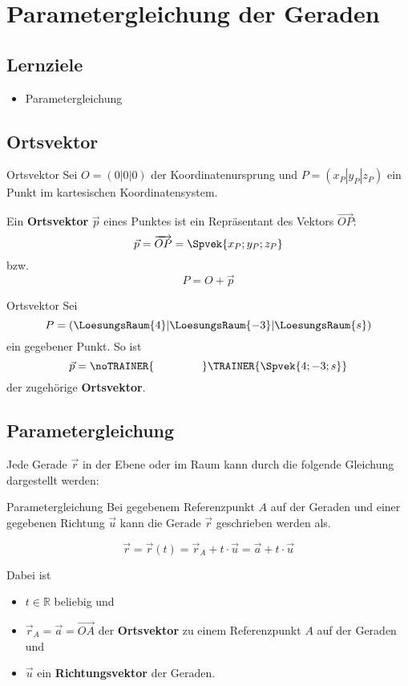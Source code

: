 \section{Parametergleichung der Geraden}

\subsection*{Lernziele}
\begin{itemize}
\item Parametergleichung
\end{itemize}

\newpage
\subsection{Ortsvektor}

\begin{definition}{Ortsvektor}{}
  Sei $O=(0|0|0)$ der Koordinatenursprung und $P=(x_P|y_P|z_P)$ ein Punkt im
  kartesischen Koordinatensystem.
  
  Ein \textbf{Ortsvektor} $\vec{p}$ eines Punktes
  ist ein Repräsentant des Vektors $\overrightarrow{OP}$:
  $$\vec{p} = \overrightarrow{OP}=\Spvek{x_P;y_P;z_P}$$
  bzw.
  $$P = O + \vec{p}$$
\end{definition}

\begin{beispiel}{Ortsvektor}{}
  Sei
  $$P=(\LoesungsRaum{4}|\LoesungsRaum{-3}|\LoesungsRaum{s})$$
  ein
gegebener Punkt. So ist
 $$\vec{p}
= \noTRAINER{\hspace{15mm}} \TRAINER{\Spvek{4;-3;s}}$$
der zugehörige \textbf{Ortsvektor}.
\end{beispiel}

\newpage
\subsection{Parametergleichung}
Jede Gerade $\vec{r}$ in der Ebene oder im Raum kann durch die
folgende Gleichung dargestellt werden:

\begin{definition}{Parametergleichung}{}
  Bei gegebenem Referenzpunkt $A$ auf der Geraden und einer gegebenen
  Richtung $\vec{u}$ kann die Gerade $\vec{r}$ geschrieben werden als.
  
  $$\vec{r} = \vec{r}(t) = \vec{r}_A + t\cdot{} \vec{u} = \vec{a} + t\cdot{}\vec{u}$$

  Dabei ist
  \begin{itemize}
    \item $t\in\mathbb{R}$ beliebig und
    \item $\vec{r}_A = \vec{a} = \overrightarrow{OA}$ der
      \textbf{Ortsvektor} zu einem Referenzpunkt $A$ auf der Geraden und
    \item $\vec{u}$ ein
      \textbf{Richtungsvektor} der Geraden.
  \end{itemize}
  
\end{definition}

